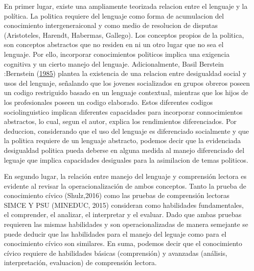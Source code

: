\documentclass[
]{article}
\begin{document}
En primer lugar, existe una ampliamente teorizada relacion entre el
lenguaje y la política. La politica requiere del lenguaje como forma de
acumulacion del conocimiento intergeneraiconal y como medio de
resolucion de disputas (Aristoteles, Harendt, Habermas, Gallego). Los
conceptos propios de la politica, son conceptos abstractos que no
residen en ni un otro lugar que no sea el lenguaje. Por ello, incorporar
conocimientos politicos implica una exigencia cognitiva y un cierto
manejo del lenguaje. Adicionalmente, Basil Berstein :Bernstein
(\protect\hyperlink{ref-bernsteinCLASESSOCIALESLENGUAJE1985}{1985})
plantea la existencia de una relacion entre desigualdad social y usos
del lenguaje, señalando que los jovenes socializados en grupos obreros
poseen un codigo restriguido basado en un lenguaje contextual, mientras
que los hijos de los profesionales poseen un codigo elaborado. Estos
diferentes codigos sociolinguistico implican diferentes capacidades para
incorporar connocimientos abstractos, lo cual, segun el autor, explica
los rendimientos diferenciados. Por deduccion, considerando que el uso
del lenguaje es diferenciado socialmente y que la politica requiere de
un lenguaje abstracto, podemos decir que la evidenciada desigualdad
politica pueda deberse en alguna medida al manejo diferenciado del
leguaje que implica capacidades desiguales para la asimilacion de temas
politicos.

En segundo lugar, la relación entre manejo del lenguaje y comprensión
lectora es evidente al revisar la operacionalización de ambos conceptos.
Tanto la prueba de conocimiento cívico (Shulz,2016) como las pruebas de
comprensión lectoras SIMCE Y PSU (MINEDUC, 2015) consideran como
habilidades fundamentales, el comprender, el analizar, el interpretar y
el evaluar. Dado que ambas pruebas requieren las mismas habilidades y
son operacionalizadas de manera semejante se puede deducir que las
habilidades para el manejo del leguaje como para el conocimiento cívico
son similares. En suma, podemos decir que el conocimiento cívico
requiere de habilidades básicas (comprensión) y avanzadas (análisis,
interpretación, evaluacion) de comprensión lectora.
\end{document}

